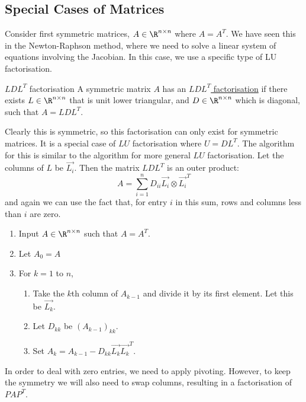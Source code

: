 \documentclass[../Main.tex]{subfiles}
\begin{document}
\subsection{Special Cases of Matrices}
Consider first symmetric matrices, $A \in \R^{n \times n}$ where $A = A^T$. We have seen this in the Newton-Raphson method, where we need to solve a linear system of equations involving the Jacobian. In this case, we use a specific type of LU factorisation.
\begin{definition}{$LDL^T$ factorisation}
    A symmetric matrix $A$ has an \underline{$LDL^T$ factorisation} if there exists $L \in \R^{n \times n}$ that is unit lower triangular, and $D \in \R^{n \times n}$ which is diagonal, such that $A = LDL^T$.
\end{definition}
Clearly this is symmetric, so this factorisation can only exist for symmetric matrices. It is a special case of $LU$ factorisation where $U = DL^T$. The algorithm for this is similar to the algorithm for more general $LU$ factorisation. Let the columns of $L$ be $\vec{L_i}$. Then the matrix $LDL^T$ is an outer product:
\begin{equation*}
    A = \sum_{i=1}^{n} D_{ii} \vec{L_i} \otimes \vec{L_i}^T
\end{equation*}
and again we can use the fact that, for entry $i$ in this sum, rows and columns less than $i$ are zero.

\begin{enumerate}
    \item Input $A \in \R^{n \times n}$ such that $A = A^T$.
    \item Let $A_0 = A$
    \item For $k = 1$ to $n$,
    \begin{enumerate}
        \item Take the $k$th column of $A_{k-1}$ and divide it by its first element. Let this be $\vec{L_k}$.
        \item Let $D_{kk}$ be $(A_{k-1})_{kk}$.
        \item Set $A_k = A_{k-1} - D_{kk} \vec{L_k} \vec{L_k}^T$.
    \end{enumerate}
\end{enumerate}
\begin{remark}
    In order to deal with zero entries, we need to apply pivoting. However, to keep the symmetry we will also need to swap columns, resulting in a factorisation of $PAP^T$.
\end{remark}
\end{document}
